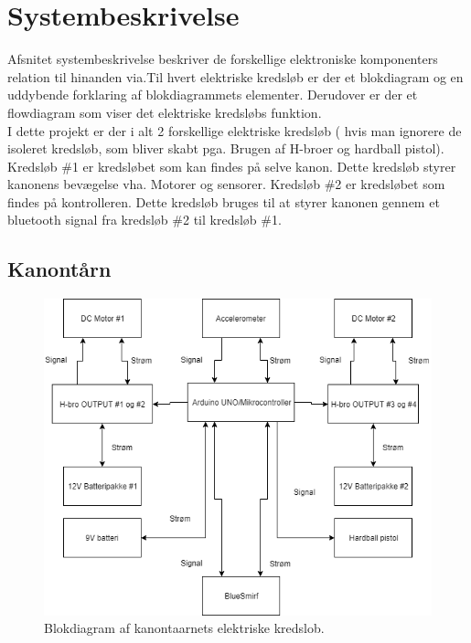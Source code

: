 \section{Systembeskrivelse}
Afsnitet systembeskrivelse beskriver de forskellige elektroniske komponenters relation til hinanden via.Til hvert elektriske kredsløb er der et blokdiagram og en uddybende forklaring af blokdiagrammets elementer. Derudover er der et flowdiagram som viser det elektriske kredsløbs funktion.\\

I dette projekt er der i alt 2 forskellige elektriske kredsløb ( hvis man ignorere de isoleret kredsløb, som bliver skabt pga. Brugen af H-broer og hardball pistol). Kredsløb \#1 er kredsløbet som kan findes på selve kanon. Dette kredsløb styrer kanonens bevægelse vha. Motorer og sensorer. Kredsløb \#2 er kredsløbet som findes på kontrolleren. Dette kredsløb bruges til at styrer kanonen gennem et bluetooth signal fra kredsløb \#2 til kredsløb \#1. \\

\subsection{Kanontårn}

\begin{figure}[H]
\centering
\includegraphics[scale=0.8]{Billeder/Kredsloeb1.png}
\caption{Blokdiagram af kanontaarnets elektriske kredslob.}
\label{fig:Blokdiagram1}
\end{figure}


